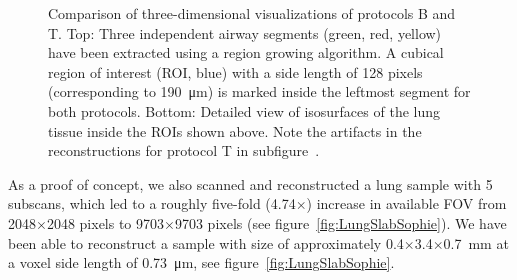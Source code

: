 \begin{figure}[htp]
{%
		}%
	\caption[Comparison of 3D visualizations of protocols B and T]{Comparison of three-dimensional visualizations of protocols B and T. Top: Three independent airway segments (green, red, yellow) have been extracted using a region growing algorithm. A cubical region of interest (ROI, blue) with a side length of 128 pixels (corresponding to \SI{190}{\micro\meter}) is marked inside the leftmost segment for both protocols. Bottom: Detailed view of isosurfaces of the lung tissue inside the ROIs shown above. Note the artifacts in the reconstructions for protocol T in subfigure~.}%
	\label{fig:BvsT2}%
\end{figure}
\cbend

As a proof of concept, we also scanned and reconstructed a lung sample with 5 subscans, which led to a roughly five-fold (4.74$\times$) increase in available FOV from 2048$\times$2048 pixels to 9703$\times$9703 pixels (see figure~\ref{fig:LungSlabSophie}). We have been able to reconstruct a sample with size of approximately 0.4$\times$3.4$\times$\SI{0.7}{\milli\meter} at a voxel side length of \SI{0.73}{\micro\meter}, see figure~\ref{fig:LungSlabSophie}.

